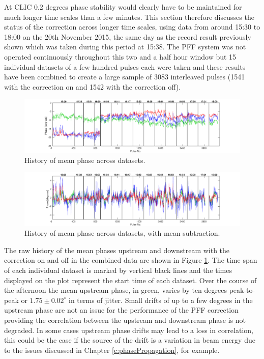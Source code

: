 
At CLIC 0.2 degrees phase stability would clearly have to be maintained for much longer time scales than a few minutes. This section therefore discusses the status of the correction across longer time scales, using data from around 15:30 to 18:00 on the 20th November 2015, the same day as the record result previously shown which was taken during this period at 15:38. The PFF system was not operated continuously throughout this two and a half hour window but 15 individual datasets of a few hundred pulses each were taken and these results have been combined to create a large sample of 3083 interleaved pulses (1541 with the correction on and 1542 with the correction off).

\begin{landscape}

\begin{figure}
  \centering
  \includegraphics[width=\hsize]{Figures/feedforward/longFF_noMeanSubHistory}
  \caption{History of mean phase across datasets.}
  \label{f:longFF_noMeanSubHistory}
\end{figure}


\begin{figure}
  \centering
  \includegraphics[width=\hsize]{Figures/feedforward/longFF_history}
  \caption{History of mean phase across datasets, with mean subtraction.}
  \label{f:longFF_history}
\end{figure}

\end{landscape}

The raw history of the mean phases upstream and downstream with the correction on and off in the combined data are shown in Figure \ref{f:longFF_noMeanSubHistory}. The time span of each individual dataset is marked by vertical black lines and the times displayed on the plot represent the start time of each dataset. Over the course of the afternoon the mean upstream phase, in green, varies by ten degrees peak-to-peak or \(1.75 \pm 0.02^\circ\) in terms of jitter. Small drifts of up to a few degrees in the upstream phase are not an issue for the performance of the PFF correction providing the correlation between the upstream and downstream phase is not degraded. In some cases upstream phase drifts may lead to a loss in correlation, this could be the case if the source of the drift is a variation in beam energy due to the issues discussed in Chapter \ref{c:phasePropagation}, for example. 

